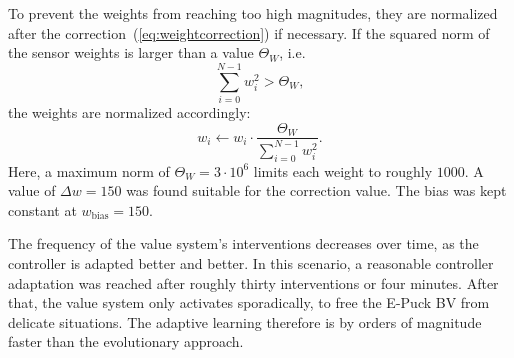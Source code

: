 \documentclass[a4paper]{jacow}
\begin{document}
To prevent the weights from reaching too high magnitudes, they are normalized after the correction~(\ref{eq:weightcorrection}) if necessary. If the squared norm of the sensor weights is larger than a value $\Theta_W$, i.e.
\begin{equation}
	\sum\limits_{i=0}^{N-1} w_i^2 > \Theta_W,
\end{equation}
the weights are normalized accordingly:
\begin{equation}
	w_i \leftarrow w_i \cdot \frac{\Theta_W}{\sum\limits_{i=0}^{N-1} w_i^2}.
\end{equation}
Here, a maximum norm of $\Theta_W=3\cdot 10^6$ limits each weight to roughly $1000$. A value of $\Delta w = 150$ was found suitable for the correction value. The bias was kept constant at $w_\text{bias} = 150$.

The frequency of the value system's interventions decreases over time, as the controller is adapted better and better. In this scenario, a reasonable controller adaptation was reached after roughly thirty interventions or four minutes. After that, the value system only activates sporadically, to free the E-Puck BV from delicate situations. The adaptive learning therefore is by orders of magnitude faster than the evolutionary approach.
\end{document}
